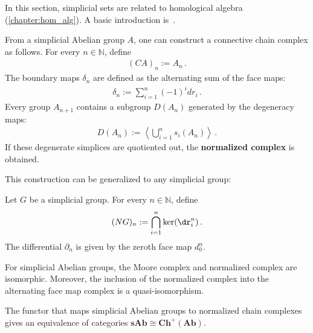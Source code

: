     In this section, simplicial sets are related to homological algebra (\cref{chapter:hom_alg}). A basic introduction is~\citet{master_why_2020}.

    \begin{construct}
        From a simplicial Abelian group $A$, one can construct a connective chain complex as follows. For every $n\in\mathbb{N}$, define
        \begin{gather}
            (CA)_n := A_n\,.
        \end{gather}
        The boundary maps $\delta_n$ are defined as the alternating sum of the face maps:
        \begin{gather}
            \delta_n := \sum_{i=1}^n(-1)^idr_i\,.
        \end{gather}
        Every group $A_{n+1}$ contains a subgroup $D(A_n)$ generated by the degeneracy maps:
        \begin{gather}
            D(A_n) := \left\langle\bigcup_{i=1}^ns_i(A_n)\right\rangle\,.
        \end{gather}
        If these degenerate simplices are quotiented out, the \textbf{normalized complex} is obtained.
    \end{construct}
    This construction can be generalized to any simplicial group:
    \begin{construct}
        Let $G$ be a simplicial group. For every $n\in\mathbb{N}$, define
        \begin{gather}
            (NG)_n := \bigcap_{i=1}^n\ker(\dr^n_i)\,.
        \end{gather}
        The differential $\partial_n$ is given by the zeroth face map $d^n_0$.
    \end{construct}
    \begin{property}[Equivalence]
        For simplicial Abelian groups, the Moore complex and normalized complex are isomorphic. Moreover, the inclusion of the normalized complex into the alternating face map complex is a quasi-isomorphism.
    \end{property}

    \begin{theorem}\label{model:dold_kan}
        The functor that maps simplicial Abelian groups to normalized chain complexes gives an equivalence of categories $\mathbf{sAb}\cong\mathbf{Ch}^+(\mathbf{Ab})$.
    \end{theorem}

